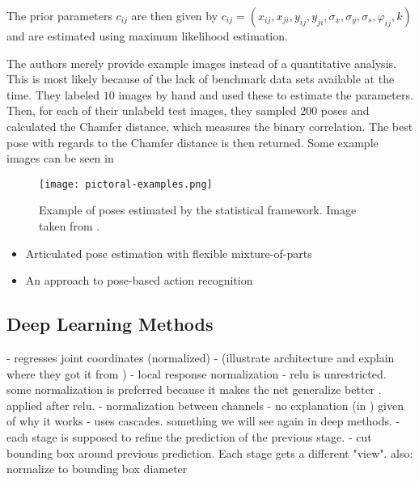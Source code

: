 The prior parameters $c_{ij}$ are then given by $c_{ij} = (x_{ij}, x_{ji}, y_{ij}, y_{ji}, \sigma_x, \sigma_y, \sigma_s, \varphi_{ij}, k)$ and are estimated using maximum likelihood estimation.

The authors merely provide example images instead of a quantitative analysis.
This is most likely because of the lack of benchmark data sets available at the time.
They labeled $10$ images by hand and used these to estimate the parameters.
Then, for each of their unlabeld test images, they sampled $200$ poses and calculated the Chamfer distance, which measures the binary correlation.
The best pose with regards to the Chamfer distance is then returned.
Some example images can be seen in 

\begin{figure}[htb!]
    \centering
    \texttt{[image: pictoral-examples.png]}
    \caption{Example of poses estimated by the statistical framework. Image taken from \cite{felzenszwalb_pictorial_2005}.}
    \label{fig:pictoral-examples}
\end{figure}

\begin{itemize}
    \item Articulated pose estimation with flexible mixture-of-parts \cite{yang_articulated_2011}
    \item An approach to pose-based action recognition \cite{wang_approach_2013}
\end{itemize}

\subsection{Deep Learning Methods}

- regresses joint coordinates (normalized)
- (illustrate architecture and explain where they got it from \cite{krizhevsky_imagenet_2012})
- local response normalization  
    - relu is unrestricted. some normalization is preferred because it makes the net generalize better \cite{krizhevsky_imagenet_2012}. applied after relu.
    - normalization between channels
    - no explanation (in \cite{krizhevsky_imagenet_2012}) given of why it works
- uses cascades. something we will see again in deep methods.
    - each stage is supposed to refine the prediction of the previous stage.
    - cut bounding box around previous prediction. Each stage gets a different "view". also: normalize to bounding box diameter

